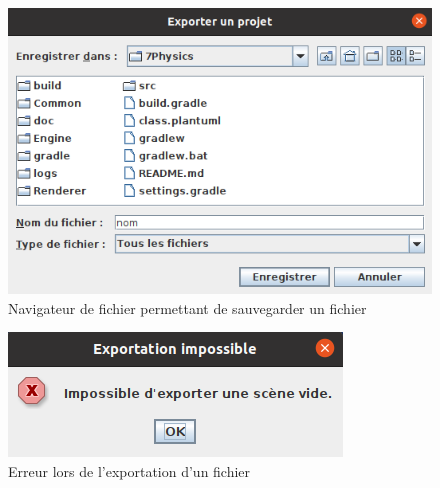 \documentclass[11pt]{report}
\begin{document}
\begin{figure}[h]
  \centering
  \includegraphics[scale=0.83]{./nav_fichier_exp.png}
  \caption{Navigateur de fichier permettant de sauvegarder un fichier}
\end{figure}

\begin{figure}[h]
  \centering
  \includegraphics{./error_exp.png}
  \caption{Erreur lors de l'exportation d'un fichier}
\end{figure}
\end{document}
